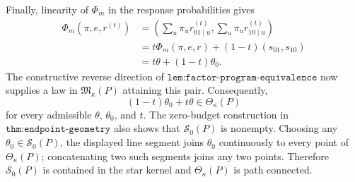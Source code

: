 Finally, linearity of \(\Phi_m\) in the response probabilities gives
\[
\begin{aligned}
\Phi_m(\pi,e,r^{(t)})
&=\left(\sum_u\pi_u r^{(t)}_{01\mid u},
          \sum_u\pi_u r^{(t)}_{10\mid u}\right)\\
&=t\Phi_m(\pi,e,r)+(1-t)(s_{01},s_{10})\\
&=t\theta+(1-t)\theta_0.
\end{aligned}
\]
The constructive reverse direction of \(\texttt{lem:factor-program-equivalence}\) now supplies a law in \(\mathfrak M_\kappa(P)\) attaining this pair.  Consequently,
\[
(1-t)\theta_0+t\theta\in\Theta_\kappa(P)
\]
for every admissible \(\theta\), \(\theta_0\), and \(t\).  The zero-budget construction in \(\texttt{thm:endpoint-geometry}\) also shows that \(\mathcal S_0(P)\) is nonempty.  Choosing any \(\theta_0\in\mathcal S_0(P)\), the displayed line segment joins \(\theta_0\) continuously to every point of \(\Theta_\kappa(P)\); concatenating two such segments joins any two points.  Therefore \(\mathcal S_0(P)\) is contained in the star kernel and \(\Theta_\kappa(P)\) is path connected.